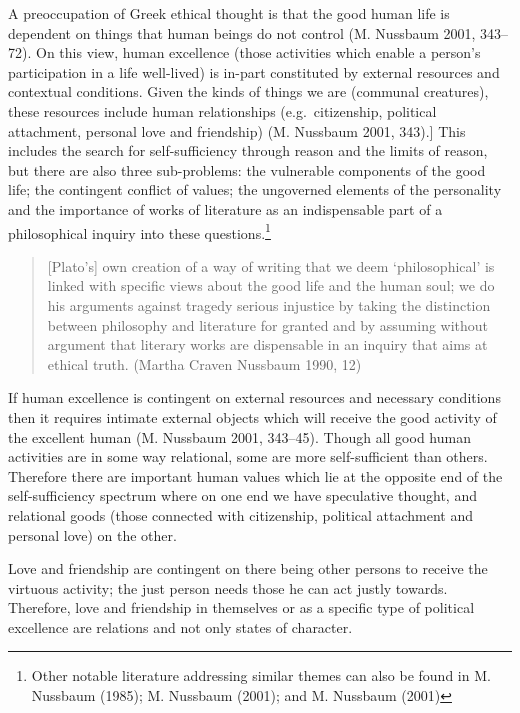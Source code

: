 \documentclass[12pt]{book}
\theoremstyle{definition}
\theoremstyle{remark}
\begin{document}
A preoccupation of Greek ethical thought is that the good human life is dependent on things that human beings do not control (M. Nussbaum 2001, 343--72). On this view, human excellence (those activities which enable a person's participation in a life well-lived) is in-part constituted by external resources and contextual conditions. Given the kinds of things we are (communal creatures), these resources include human relationships (e.g.~citizenship, political attachment, personal love and friendship) (M. Nussbaum 2001, 343).{]} This includes the search for self-sufficiency through reason and the limits of reason, but there are also three sub-problems: the vulnerable components of the good life; the contingent conflict of values; the ungoverned elements of the personality and the importance of works of literature as an indispensable part of a philosophical inquiry into these questions.\footnote{Other notable literature addressing similar themes can also be found in M. Nussbaum (1985); M. Nussbaum (2001); and M. Nussbaum (2001)}

\begin{quote}
{[}Plato's{]} own creation of a way of writing that we deem `philosophical' is linked with specific views about the good life and the human soul; we do his arguments against tragedy serious injustice by taking the distinction between philosophy and literature for granted and by assuming without argument that literary works are dispensable in an inquiry that aims at ethical truth. (Martha Craven Nussbaum 1990, 12)
\end{quote}

If human excellence is contingent on external resources and necessary conditions then it requires intimate external objects which will receive the good activity of the excellent human (M. Nussbaum 2001, 343--45). Though all good human activities are in some way relational, some are more self-sufficient than others. Therefore there are important human values which lie at the opposite end of the self-sufficiency spectrum where on one end we have speculative thought, and relational goods (those connected with citizenship, political attachment and personal love) on the other.

Love and friendship are contingent on there being other persons to receive the virtuous activity; the just person needs those he can act justly towards. Therefore, love and friendship in themselves or as a specific type of political excellence are relations and not only states of character.
\end{document}

